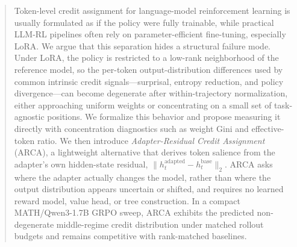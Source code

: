 \begin{abstract}\noindent Token-level credit assignment for language-model
reinforcement learning is usually formulated as if the policy were fully
trainable, while practical LLM-RL pipelines often rely on
parameter-efficient fine-tuning, especially LoRA. We argue that this
separation hides a structural failure mode. Under LoRA, the policy is
restricted to a low-rank neighborhood of the reference model, so the
per-token output-distribution differences used by common intrinsic credit
signals---surprisal, entropy reduction, and policy divergence---can become
degenerate after within-trajectory normalization, either approaching uniform
weights or concentrating on a small set of task-agnostic positions. We
formalize this behavior and propose measuring it directly with concentration
diagnostics such as weight Gini and effective-token ratio. We then introduce \emph{Adapter-Residual Credit
Assignment} (ARCA), a lightweight alternative that derives token salience from
the adapter's own hidden-state residual,
$\|h^{\text{adapted}}_t - h^{\text{base}}_t\|_2$. ARCA asks where the adapter
actually changes the model, rather than where the output distribution appears
uncertain or shifted, and requires no learned reward model, value head, or tree
construction. In a compact MATH/Qwen3-1.7B GRPO sweep, ARCA exhibits the
predicted non-degenerate middle-regime credit distribution under matched
rollout budgets and remains competitive with rank-matched baselines.
\end{abstract}

